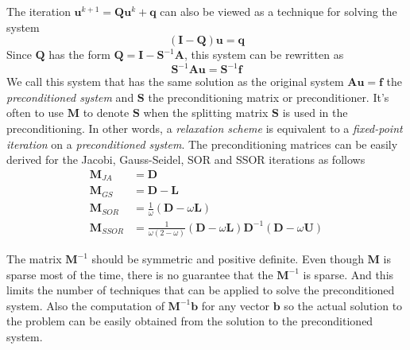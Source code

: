 The iteration $\boldsymbol{u}^{k+1} = \boldsymbol{Q}\boldsymbol{u}^k + \boldsymbol{q}$ can also be viewed as a technique for solving the system
\begin{equation}
    (\boldsymbol{I} - \boldsymbol{Q})\boldsymbol{u} = \boldsymbol{q}
\end{equation}
Since $\boldsymbol{Q}$ has the form $\boldsymbol{Q} = \boldsymbol{I} - \boldsymbol{S}^{-1}\boldsymbol{A}$, this system can be rewritten as
\begin{equation}
    \boldsymbol{S}^{-1}\boldsymbol{A}\boldsymbol{u} = \boldsymbol{S}^{-1}\boldsymbol{f}
    \label{eqn:preconditioned-system}
\end{equation}
We call this system that has the same solution as the original system $\boldsymbol{A}\boldsymbol{u} = \boldsymbol{f}$ the \textit{preconditioned system} and $\boldsymbol{S}$ the preconditioning matrix or preconditioner. It's often to use $\boldsymbol{M}$ to denote $\boldsymbol{S}$ when the splitting matrix $\boldsymbol{S}$ is used in the preconditioning. In other words, a \textit{relaxation scheme} is equivalent to a \textit{fixed-point iteration} on a \textit{preconditioned system}.
The preconditioning matrices can be easily derived for the Jacobi, Gauss-Seidel, SOR and SSOR iterations as follows
\begin{align}
    \boldsymbol{M}_{JA} &= \boldsymbol{D} \\
    \boldsymbol{M}_{GS} &= \boldsymbol{D} - \boldsymbol{L} \\
    \boldsymbol{M}_{SOR} &= \frac{1}{\omega}(\boldsymbol{D} - \omega\boldsymbol{L}) \\
    \boldsymbol{M}_{SSOR} &= \frac{1}{\omega(2-\omega)}(\boldsymbol{D} - \omega\boldsymbol{L})\boldsymbol{D}^{-1}(\boldsymbol{D} - \omega\boldsymbol{U})
\end{align}




The matrix $\boldsymbol{M}^{-1}$ should be symmetric and positive definite. Even though $\boldsymbol{M}$ is sparse most of the time, there is no guarantee that the $\boldsymbol{M}^{-1}$ is sparse. And this limits the number of techniques that can be applied to solve the preconditioned system. Also the computation of $\boldsymbol{M}^{-1}\boldsymbol{b}$ for any vector $\boldsymbol{b}$ so the actual solution to the problem can be easily obtained from the solution to the preconditioned system.


